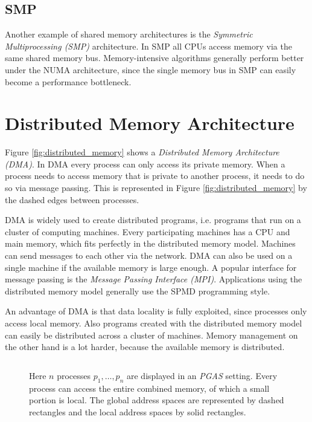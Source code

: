 \subsection{SMP}
Another example of shared memory architectures is the \emph{Symmetric Multiprocessing (SMP)} architecture. In SMP all CPUs access memory via the same shared memory bus. Memory-intensive algorithms generally perform better under the NUMA architecture, since the single memory bus in SMP can easily become a performance bottleneck.

\section{Distributed Memory Architecture}
Figure \ref{fig:distributed_memory} shows a \emph{Distributed Memory Architecture (DMA)}. In DMA every process can only access its private memory. When a process needs to access memory that is private to another process, it needs to do so via message passing. This is represented in Figure \ref{fig:distributed_memory} by the dashed edges between processes. 

DMA is widely used to create distributed programs, i.e. programs that run on a cluster of computing machines. Every participating machines has a CPU and main memory, which fits perfectly in the distributed memory model. Machines can send messages to each other via the network. DMA can also be used on a single machine if the available memory is large enough. A popular interface for message passing is the \emph{Message Passing Interface (MPI)}. Applications using the distributed memory model generally use the SPMD programming style.

An advantage of DMA is that data locality is fully exploited, since processes only access local memory. Also programs created with the distributed memory model can easily be distributed across a cluster of machines. Memory management on the other hand is a lot harder, because the available memory is distributed.

\begin{figure}
	\centering
	\subfloat[PGAS] {
		
		\label{fig:pgas}
	}
	$\hspace{36pt}$
	\caption{Here $n$ processes $p_1, \dots, p_n$ are displayed in an \emph{PGAS} setting. Every process can access the entire combined memory, of which a small portion is local. The global address spaces are represented by dashed rectangles and the local address spaces by solid rectangles. }
	\label{fig:pgas_hybrid_pgas}
\end{figure}

